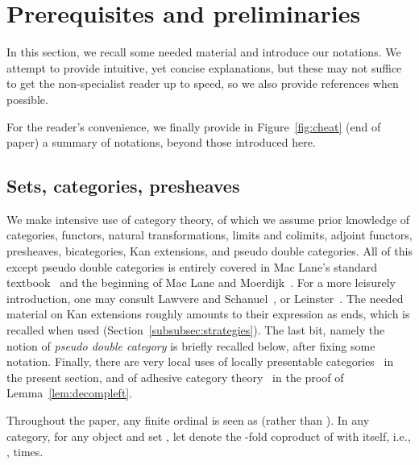 \documentclass{LMCS}
\theoremstyle{plain}\newtheorem{satz}[thm]{Satz}
\begin{document}
\section{Prerequisites and preliminaries}\label{sec:prelim}
In this section, we recall some needed material and introduce our
notations.  We attempt to provide intuitive, yet concise explanations,
but these may not suffice to get the non-specialist reader up to
speed, so we also provide references when possible.

For the reader's convenience, we finally provide in
Figure~\ref{fig:cheat} (end of paper) a summary of notations, beyond
those introduced here.

\subsection{Sets, categories, presheaves}\label{subsec:prelim:cats}
We make intensive use of category theory, of which we assume prior
knowledge of categories, functors, natural transformations, limits and
colimits, adjoint functors, presheaves, bicategories, Kan extensions,
and pseudo double categories. All of this except pseudo double
categories is entirely covered in Mac Lane's standard
textbook~\cite{MacLane:cwm} and the beginning of Mac Lane and
Moerdijk~\cite{MM}. For a more leisurely introduction, one may consult
Lawvere and Schanuel~\cite{DBLP:books/daglib/0095291}, or
Leinster~\cite{LeinsterCats}.  The needed material on Kan extensions
roughly amounts to their expression as ends, which is recalled when
used (Section~\ref{subsubsec:strategies}).  The last bit, namely the
notion of \emph{pseudo double category} is briefly recalled below,
after fixing some notation.  Finally, there are very local uses of
locally presentable categories~\cite{Adamek} in the present section,
and of adhesive category theory~\cite{DBLP:conf/fossacs/LackS04} in
the proof of Lemma~\ref{lem:decompleft}.

Throughout the paper, any finite ordinal  is seen as  (rather than ).
In any category, for any object  and set , let 
denote the -fold coproduct of  with itself, i.e., ,  times.
\end{document}

